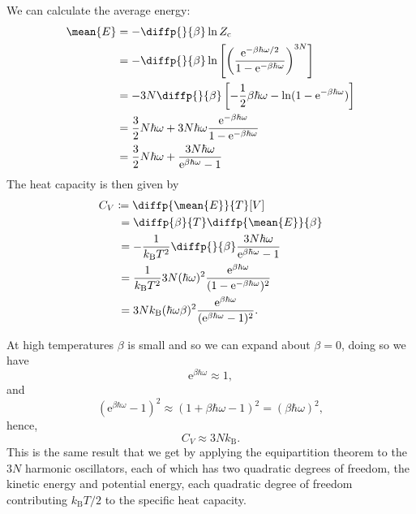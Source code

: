 \documentclass[fleqn]{NotesClass}
\newcommand*{\boltzmann}{k_{\mathrm{B}}}
\newcommand*{\cpartition}{Z_{\mathrm{c}}}
\newcommand*{\e}{\mathrm{e}}
\begin{document}
    We can calculate the average energy:
    \begin{align}
        \mean{E} &= - \diffp{}{\beta} \ln \cpartition\\
        &= -\diffp{}{\beta} \ln\left[ \left( \frac{\e^{-\beta\hbar\omega/2}}{1 - \e^{-\beta\hbar\omega}} \right)^{3N} \right]\\
        &= -3N \diffp{}{\beta} \left[ -\frac{1}{2}\beta\hbar\omega - \ln(1 - \e^{-\beta\hbar\omega}) \right]\\
        &= \frac{3}{2}N\hbar\omega + 3N\hbar\omega\frac{\e^{-\beta\hbar\omega}}{1 - \e^{-\beta\hbar\omega}}\\
        &= \frac{3}{2}N\hbar\omega + \frac{3N\hbar\omega}{\e^{\beta\hbar\omega} - 1}
    \end{align}
    The heat capacity is then given by
    \begin{align}
        C_V &\coloneqq \diffp{\smash{\mean{E}}}{T}[V]\\
        &\hphantom{:}= \diffp{\beta}{T}\diffp{\mean{E}}{\beta}\\
        &\hphantom{:}= -\frac{1}{\boltzmann T^2} \diffp{}{\beta} \frac{3N\hbar\omega}{\e^{\beta\hbar\omega} - 1}\\
        &\hphantom{:}= \frac{1}{\boltzmann T^2} 3N (\hbar\omega)^2 \frac{\e^{\beta\hbar\omega}}{(1 - \e^{-\beta\hbar\omega})^2}\\
        &\hphantom{:}= 3N\boltzmann(\hbar\omega\beta)^2 \frac{\e^{\beta\hbar\omega}}{(\e^{\beta\hbar\omega} - 1)^2}.
    \end{align}
    
    At high temperatures \(\beta\) is small and so we can expand about \(\beta = 0\), doing so we have
    \begin{equation}
        \e^{\beta\hbar\omega} \approx 1,
    \end{equation}
    and
    \begin{equation}
        (\e^{\beta\hbar\omega} - 1)^{2} \approx (1 + \beta\hbar\omega - 1)^2 = (\beta\hbar\omega)^2,
    \end{equation}
    hence,
    \begin{equation}
        C_V \approx 3N\boltzmann.
    \end{equation}
    This is the same result that we get by applying the equipartition theorem to the \(3N\) harmonic oscillators, each of which has two quadratic degrees of freedom, the kinetic energy and potential energy, each quadratic degree of freedom contributing \(\boltzmann T/2\) to the specific heat capacity.
    
\end{document}
